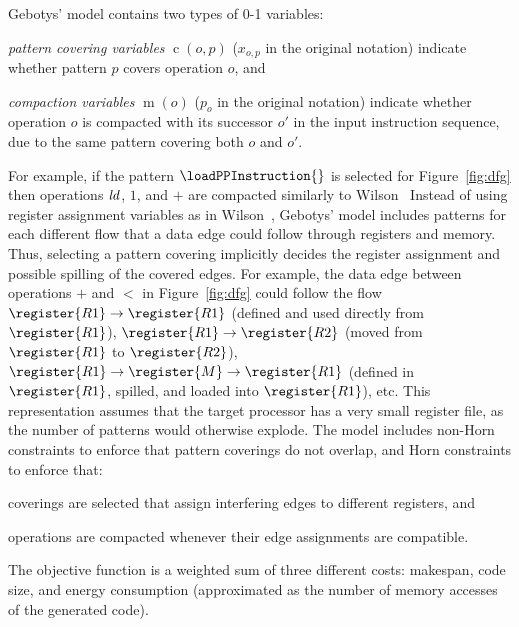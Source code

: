 \documentclass[acmsmall,authorversion,nonacm]{acmart}
\newcommand{\noMathVar}[2]{\operatorname{#1}(#2)}
\newcommand{\var}[2]{$\noMathVar{#1}{#2}$}
\begin{document}
Gebotys' model contains two types of 0-1 variables:
\begin{inparaitem}[]
\item \emph{pattern covering variables} \var{c}{o,p} ($x_{o,p}$ in the
  original notation) indicate whether pattern $p$ covers operation
  $o$, and
\item \emph{compaction variables} \var{m}{o} ($p_o$ in the original
  notation) indicate whether operation $o$ is compacted with its
  successor $o'$ in the input instruction sequence, due to the same
  pattern covering both $o$ and $o'$\!.
\end{inparaitem}
For example, if the pattern $\loadPPInstruction{}$ is selected for
Figure~\ref{fig:dfg} then operations $\textrm{{\emph{ld}}}$, $1$, and
$+$ are compacted similarly to Wilson~\etal{}
Instead of using register assignment variables as in Wilson~\etal{},
Gebotys' model includes patterns for each different flow that a data
edge could follow through registers and memory.
Thus, selecting a pattern covering implicitly decides the register
assignment and possible spilling of the covered edges.
For example, the data edge between operations $+$ and $<$ in
Figure~\ref{fig:dfg} could follow the flow $\register{R1} \rightarrow
\register{R1}$ (defined and used directly from $\register{R1}$),
$\register{R1} \rightarrow \register{R2}$ (moved from $\register{R1}$
to $\register{R2}$), $\register{R1} \rightarrow \register{M}
\rightarrow \register{R1}$ (defined in $\register{R1}$, spilled, and
loaded into $\register{R1}$), etc.
This representation assumes that the target processor has a very small
register file, as the number of patterns would otherwise explode.
The model includes non-Horn constraints to enforce that pattern
coverings do not overlap, and Horn constraints to enforce that:
\begin{inparaitem}[]
\item coverings are selected that assign interfering edges to
  different registers, and
\item operations are compacted whenever their edge assignments are
  compatible.
\end{inparaitem}
The objective function is a weighted sum of three different costs:
makespan, code size, and energy consumption (approximated as the
number of memory accesses of the generated code).
\end{document}
